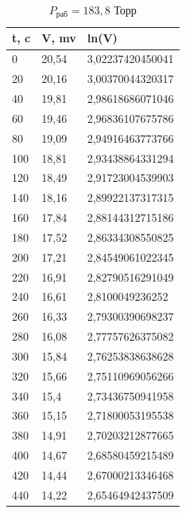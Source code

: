 \documentclass[12pt]{article}
\begin{document}
\begin{table}[H]
	\centering
	\begin{tabular}{|l|l|l|}
		\hline
		t, c & V, mv & ln(V)            \\ \hline
		0    & 20,54 & 3,02237420450041 \\ \hline
		20   & 20,16 & 3,00370044320317 \\ \hline
		40   & 19,81 & 2,98618686071046 \\ \hline
		60   & 19,46 & 2,96836107675786 \\ \hline
		80   & 19,09 & 2,94916463773766 \\ \hline
		100  & 18,81 & 2,93438864331294 \\ \hline
		120  & 18,49 & 2,91723004539903 \\ \hline
		140  & 18,16 & 2,89922137317315 \\ \hline
		160  & 17,84 & 2,88144312715186 \\ \hline
		180  & 17,52 & 2,86334308550825 \\ \hline
		200  & 17,21 & 2,84549061022345 \\ \hline
		220  & 16,91 & 2,82790516291049 \\ \hline
		240  & 16,61 & 2,8100049236252  \\ \hline
		260  & 16,33 & 2,79300390698237 \\ \hline
		280  & 16,08 & 2,77757626375082 \\ \hline
		300  & 15,84 & 2,76253838638628 \\ \hline
		320  & 15,66 & 2,75110969056266 \\ \hline
		340  & 15,4  & 2,73436750941958 \\ \hline
		360  & 15,15 & 2,71800053195538 \\ \hline
		380  & 14,91 & 2,70203212877665 \\ \hline
		400  & 14,67 & 2,68580459215489 \\ \hline
		420  & 14,44 & 2,67000213346468 \\ \hline
		440  & 14,22 & 2,65464942437509 \\ \hline
	\end{tabular}
	\caption{$P_\text{раб} = 183,8$ Торр}
\end{table}
\end{document}
